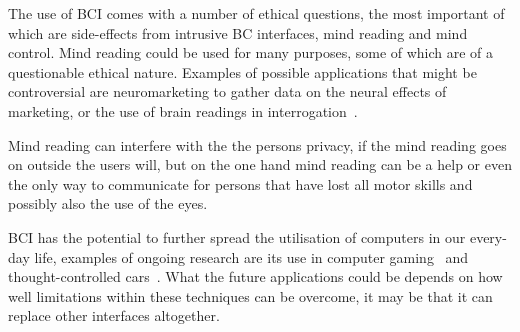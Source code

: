 The use of BCI comes with a number of ethical questions, the most important of which are side-effects from intrusive BC interfaces, mind reading and mind control. Mind reading could be used for many purposes, some of which are of a questionable ethical nature. Examples of possible applications that might be controversial are neuromarketing to gather data on the neural effects of marketing, or the use of brain readings in interrogation~\cite{10.1371/journal.pbio.1001289, CB:CB252}.

Mind reading can interfere with the the persons privacy, if the mind reading goes on outside the users will, but on the one hand mind reading can be a help or even the only way to communicate for persons that have lost all motor skills and possibly also the use of the eyes.

BCI has the potential to further spread the utilisation of computers in our every-day life, examples of ongoing research are its use in computer gaming~\cite{gurkok2012brain} and thought-controlled cars~\cite{gohring2013semi}. What the future applications could be depends on how well limitations within these techniques can be overcome, it may be that it can replace other interfaces altogether.

